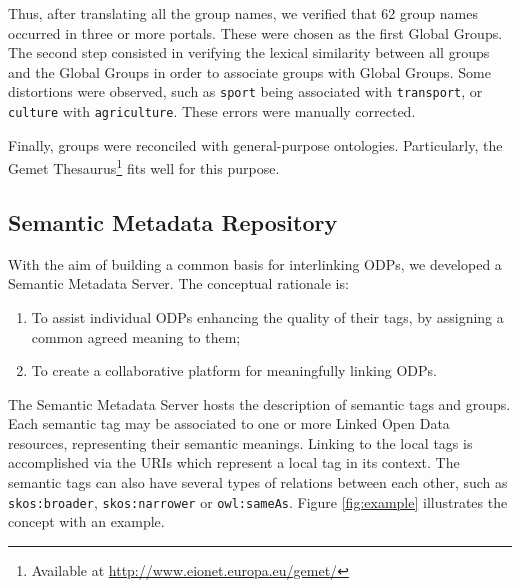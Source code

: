 Thus, after translating all the group names, we verified that 62 group names occurred in three or more portals.
These were chosen as the first Global Groups.
The second step consisted in verifying the lexical similarity between all groups and the Global Groups in order to associate groups with Global Groups.
Some distortions were observed, such as \texttt{sport} being associated with \texttt{transport}, or \texttt{culture} with \texttt{agriculture}.
These errors were manually corrected.

Finally, groups were reconciled with general-purpose ontologies.
Particularly, the Gemet Thesaurus\footnote{Available at \url{http://www.eionet.europa.eu/gemet/}} fits well for this purpose.


\subsection{Semantic Metadata Repository}
\label{sec:semantic_tags_plugin}

With the aim of building a common basis for interlinking ODPs, we developed a Semantic Metadata Server.
The conceptual rationale is:
\begin{enumerate}
	\item To assist individual ODPs enhancing the quality of their tags, by assigning a common agreed meaning to them;
	\item To create a collaborative platform for meaningfully linking ODPs.
\end{enumerate}

The Semantic Metadata Server hosts the description of semantic tags and groups.
Each semantic tag may be associated to one or more Linked Open Data resources, representing their semantic meanings.
Linking to the local tags is accomplished via the URIs which represent a local tag in its context.
The semantic tags can also have several types of relations between each other, such as \texttt{skos:broader}, \texttt{skos:narrower} or \texttt{owl:sameAs}.
Figure \ref{fig:example} illustrates the concept with an example.

